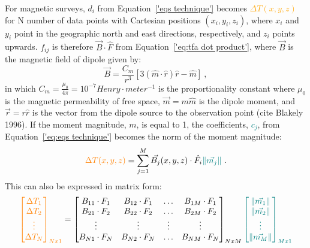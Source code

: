 For magnetic surveys, {$d_i$} from Equation~\ref{'eqs technique'} becomes \textcolor{orange}{$\Delta T(x, y, z)$} for N number of data points with Cartesian positions $(x_i, y_i, z_i)$, where $x_i$ and $y_i$ point in the geographic north and east directions, respectively, and $z_i$ points upwards. $f_{ij}$ is therefore $\vec{B} \cdot \hat{F}$ from Equation~\ref{'eq:tfa dot product'}, where $\vec{B}$ is the magnetic field of dipole given by:
\begin{equation}
    \vec{B} = \frac{C_m}{r^3} [3 ( \hat{m} \cdot \hat{r}) \hat{r} - \hat{m}]
    \ ,
\end{equation}
in which $C_m = \frac{\mu_0}{4 \pi} = 10^{-7} Henry \cdot meter^{-1}$ is the proportionality constant where $\mu_0$ is the magnetic permeability of free space, $ \vec{m} = m \hat{m}$ is the dipole moment, and $\vec{r} = r \hat{r} $ is the vector from the dipole source to the observation point (cite Blakely 1996). If the moment magnitude, $m$, is equal to 1, the coefficients, \textcolor{teal}{$c_j$}, from Equation~\ref{'eq:eqs technique'} becomes the norm of the moment magnitude:
\begin{equation}
\textcolor{orange}{\Delta T (x, y, z)} = \sum_{j=1}^{M}  \vec{B_j}(x, y, z) \cdot \hat{F_i} \textcolor{teal}{\left\lVert \vec{m_j} \right\rVert}
\ .
\end{equation}
This can also be expressed in matrix form:
\begin{equation}
\textcolor{orange}{\begin{bmatrix}
    \Delta T_1 \\ \Delta T_2 \\ \vdots \\ \Delta T_N
\end{bmatrix}_{Nx1}} = \begin{bmatrix}
    B_{11} \cdot F_{1} & B_{12} \cdot F_{1} & \hdots & B_{1M} \cdot F_{1} \\
    B_{21} \cdot F_{2} & B_{22} \cdot F_{2} & \hdots & B_{2M} \cdot F_{2} \\
    \vdots & \vdots & \vdots & \vdots \\
    B_{N1} \cdot F_{N} & B_{N2} \cdot F_{N} & \hdots & B_{NM} \cdot F_{N} \\
\end{bmatrix}_{NxM} \textcolor{teal}{\begin{bmatrix}
    \left\lVert \vec{m_1} \right\rVert \\ \left\lVert \vec{m_2} \right\rVert \\ \vdots \\ \left\lVert \vec{m_M} \right\rVert
\end{bmatrix}_{Mx1}}
\end{equation}

